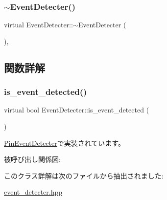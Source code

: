 \subsubsection{\texorpdfstring{$\sim$EventDetecter()}{~EventDetecter()}}
{\footnotesize\ttfamily virtual Event\+Detecter\+::$\sim$\+Event\+Detecter (\begin{DoxyParamCaption}{ }\end{DoxyParamCaption})\hspace{0.3cm}{\ttfamily [inline]}, {\ttfamily [virtual]}}



\subsection{関数詳解}
\mbox{\label{class_event_detecter_ae5f2c62e1226dcd9434eef3db92a8a70}} 
\subsubsection{\texorpdfstring{is\_event\_detected()}{is\_event\_detected()}}
{\footnotesize\ttfamily virtual bool Event\+Detecter\+::is\+\_\+event\+\_\+detected (\begin{DoxyParamCaption}{ }\end{DoxyParamCaption})\hspace{0.3cm}{\ttfamily [pure virtual]}}



\mbox{\hyperlink{class_pin_event_detecter_a6e65a11e39838c30f58c66dd057abc90}{Pin\+Event\+Detecter}}で実装されています。

被呼び出し関係図\+:


このクラス詳解は次のファイルから抽出されました\+:\begin{DoxyCompactItemize}
\item 
\mbox{\hyperlink{event__detecter_8hpp}{event\+\_\+detecter.\+hpp}}\end{DoxyCompactItemize}
